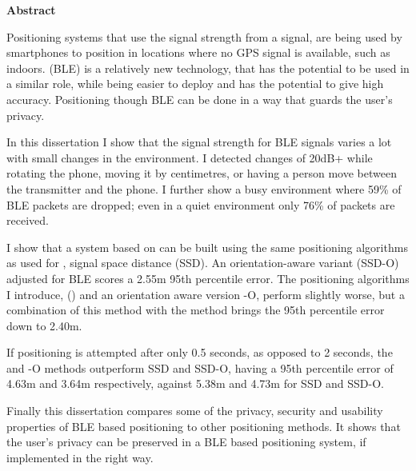 \newpage
{\Huge \bf Abstract}
\vspace{24pt} 

Positioning systems that use the signal strength from a \wifi signal, are being used by smartphones to position in locations where no GPS signal is available, such as indoors.
\BLE (BLE) is a relatively new technology, that has the potential to be used in a similar role, while being easier to deploy and has the potential to give high accuracy.
Positioning though BLE can be done in a way that guards the user's privacy.

In this dissertation I show that the signal strength for BLE signals varies a lot with small changes in the environment.
I detected changes of 20dB+ while rotating the phone, moving it by centimetres, or having a person move between the transmitter and the phone.
I further show a busy environment where 59\% of BLE packets are dropped; even in a quiet environment only 76\% of packets are received.

I show that a \ptfp system based on \BLE can be built using the same positioning algorithms as used for \wifi, signal space distance (SSD).
An orientation-aware variant (SSD-O) adjusted for BLE scores a 2.55m 95th percentile error. 
The positioning algorithms I introduce,  (\aBRP) and an orientation aware version \aBRP-O, perform slightly worse, but a combination of this method with the \wifi method brings the 95th percentile error down to 2.40m.

If positioning is attempted after only 0.5 seconds, as opposed to 2 seconds, the \aBRP and \aBRP-O methods outperform SSD and SSD-O, having a 95th percentile error of 4.63m and 3.64m respectively, against 5.38m and 4.73m for SSD and SSD-O.

Finally this dissertation compares some of the privacy, security and usability properties of BLE based positioning to other positioning methods.
It shows that the user's privacy can be preserved in a BLE based positioning system, if implemented in the right way.

\newpage
\vspace*{\fill}

